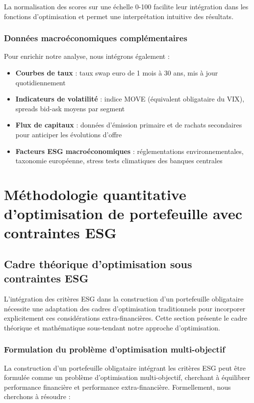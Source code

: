 La normalisation des scores sur une échelle 0-100 facilite leur intégration dans les fonctions d'optimisation et permet une interprétation intuitive des résultats.

\subsubsection{Données macroéconomiques complémentaires}

Pour enrichir notre analyse, nous intégrons également :

\begin{itemize}
    \item \textbf{Courbes de taux} : taux swap euro de 1 mois à 30 ans, mis à jour quotidiennement
    \item \textbf{Indicateurs de volatilité} : indice MOVE (équivalent obligataire du VIX), spreads bid-ask moyens par segment
    \item \textbf{Flux de capitaux} : données d'émission primaire et de rachats secondaires pour anticiper les évolutions d'offre
    \item \textbf{Facteurs ESG macroéconomiques} : réglementations environnementales, taxonomie européenne, stress tests climatiques des banques centrales
\end{itemize}

\section{Méthodologie quantitative d'optimisation de portefeuille avec contraintes ESG}

\subsection{Cadre théorique d'optimisation sous contraintes ESG}

L'intégration des critères ESG dans la construction d'un portefeuille obligataire nécessite une adaptation des cadres d'optimisation traditionnels pour incorporer explicitement ces considérations extra-financières. Cette section présente le cadre théorique et mathématique sous-tendant notre approche d'optimisation.

\subsubsection{Formulation du problème d'optimisation multi-objectif}

La construction d'un portefeuille obligataire intégrant les critères ESG peut être formulée comme un problème d'optimisation multi-objectif, cherchant à équilibrer performance financière et performance extra-financière. Formellement, nous cherchons à résoudre :

